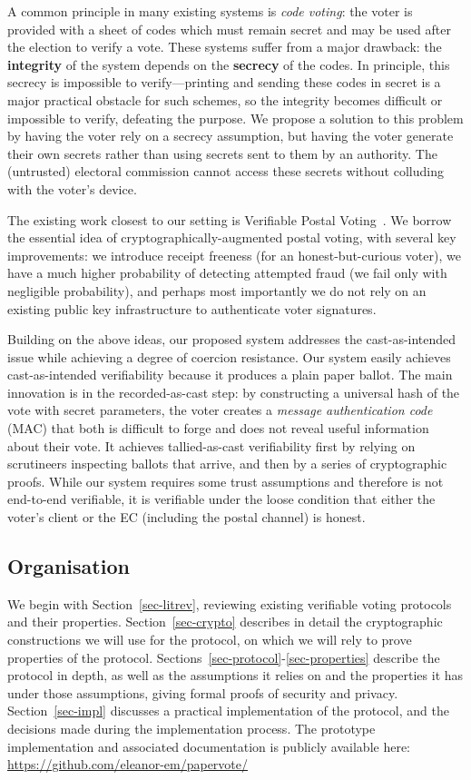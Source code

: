 \documentclass[12pt,a4paper]{article}
\theoremstyle{definition}
\begin{document}
A common principle in many existing systems is \textit{code voting}: the voter is provided with a sheet of codes which must remain secret and may be used after the election to verify a vote. These systems suffer from a major drawback: the \textbf{integrity} of the system depends on the \textbf{secrecy} of the codes. In principle, this secrecy is impossible to verify---printing and sending these codes in secret is a major practical obstacle for such schemes, so the integrity becomes difficult or impossible to verify, defeating the purpose. We propose a solution to this problem by having the voter rely on a secrecy assumption, but having the voter generate their own secrets rather than using secrets sent to them by an authority. The (untrusted) electoral commission cannot access these secrets without colluding with the voter's device.

The existing work closest to our setting is Verifiable Postal Voting~\cite{benaloh2013verifiable}. We borrow the essential idea of cryptographically-augmented postal voting, with several key improvements: we introduce receipt freeness (for an honest-but-curious voter), we have a much higher probability of detecting attempted fraud (we fail only with negligible probability), and perhaps most importantly we do not rely on an existing public key infrastructure to authenticate voter signatures.

Building on the above ideas, our proposed system addresses the cast-as-intended issue while achieving a degree of coercion resistance. Our system easily achieves cast-as-intended verifiability because it produces a plain paper ballot. The main innovation is in the recorded-as-cast step: by constructing a universal hash of the vote with secret parameters, the voter creates a \textit{message authentication code} (MAC) that both is difficult to forge and does not reveal useful information about their vote. It achieves tallied-as-cast verifiability first by relying on scrutineers inspecting ballots that arrive, and then by a series of cryptographic proofs. While our system requires some trust assumptions and therefore is not end-to-end verifiable, it is verifiable under the loose condition that either the voter's client or the EC (including the postal channel) is honest.

\subsection{Organisation}
We begin with Section~\ref{sec-litrev}, reviewing existing verifiable voting protocols and their properties. Section~\ref{sec-crypto} describes in detail the cryptographic constructions we will use for the protocol, on which we will rely to prove properties of the protocol. Sections~\ref{sec-protocol}-\ref{sec-properties} describe the protocol in depth, as well as the assumptions it relies on and the properties it has under those assumptions, giving formal proofs of security and privacy. Section~\ref{sec-impl} discusses a practical implementation of the protocol, and the decisions made during the implementation process. The prototype implementation and associated documentation is publicly available here: \url{https://github.com/eleanor-em/papervote/}
\end{document}
